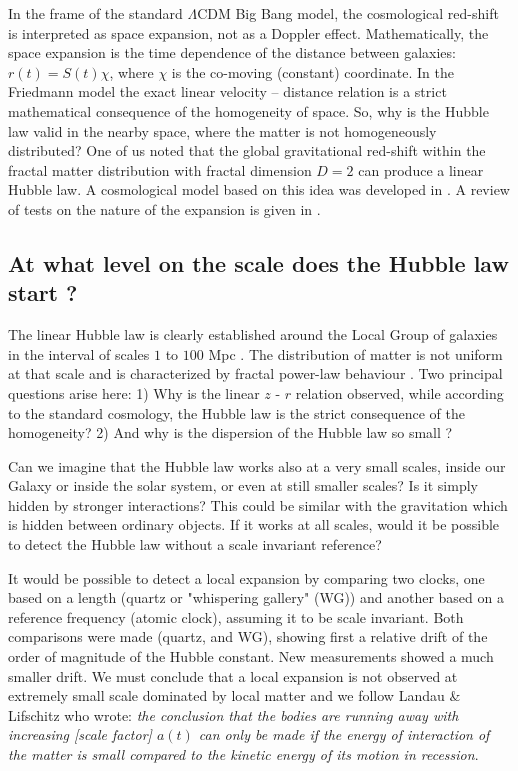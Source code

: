 In the frame of the standard $\Lambda$CDM Big Bang model, the cosmological red-shift is interpreted as space expansion, not as a Doppler effect. Mathematically, the space expansion is the time dependence of the distance between galaxies: $r(t)=S(t)\chi$, where $\chi$ is the co-moving (constant) coordinate. In the Friedmann model the exact linear velocity – distance relation is a strict mathematical consequence of the homogeneity of space. So, why is the Hubble law valid in the nearby space, where the matter is not homogeneously distributed?
One of us \cite{fract} noted that the global gravitational red-shift within the fractal matter distribution with fractal dimension $D = 2$ can produce a linear Hubble law. A cosmological model based on this idea was developed in \cite{fractmod}.
A review of tests on the nature of the expansion is given in \cite{lopez}.
\subsection{At what level on the scale does the Hubble law start ?  }
\label{sec4.3}
The linear Hubble law is clearly established around the Local Group of galaxies in the interval of scales $1$ to $100$ Mpc \cite{linhl}. The distribution of matter is not uniform at that scale and is characterized by fractal power-law behaviour \cite{klun,sylos}.
Two principal questions arise here: 1) Why is the linear $z$ - $r$ relation observed, while according to the standard cosmology, the Hubble law is the strict consequence of the homogeneity? \cite{teka,yuri2}  2) And why is the dispersion of the Hubble law so small \cite{disphl}?

	Can we imagine that the Hubble law works also at a very small scales, inside our Galaxy or inside the solar system, or even at still smaller scales? Is it simply hidden by stronger interactions? This could be similar with the gravitation which is hidden between ordinary objects. If it works at all scales, would it be possible to detect the Hubble law without a scale invariant reference?

It would be possible to detect a local expansion by comparing two clocks, one based on a length (quartz or  "whispering gallery" (WG)) and another based on a reference frequency (atomic clock), assuming it to be scale invariant. Both comparisons were made (quartz, and WG), showing first a relative drift of  the order of magnitude of the Hubble constant. New measurements showed a much smaller drift\cite{biz}. We must conclude that a local expansion is not observed at extremely small scale dominated by local matter and we follow Landau \& Lifschitz \cite{ll} who wrote: {\it{the conclusion that the bodies are running away with increasing [scale factor] $a(t)$ can only be made if the energy of interaction of the matter is small compared to the kinetic energy of its motion in recession}}.

